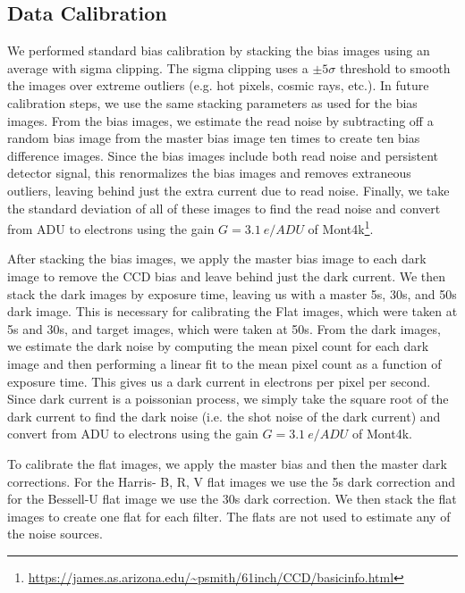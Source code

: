 \documentclass{aastex631}
\begin{document}
\subsection{Data Calibration}
We performed standard bias calibration by stacking the bias images using an average with sigma clipping. The sigma clipping uses a $\pm 5 \sigma$ threshold to smooth the images over extreme outliers (e.g. hot pixels, cosmic rays, etc.). In future calibration steps, we use the same stacking parameters as used for the bias images. From the bias images, we estimate the read noise by subtracting off a random bias image from the master bias image ten times to create ten bias difference images. Since the bias images include both read noise and persistent detector signal, this renormalizes the bias images and removes extraneous outliers, leaving behind just the extra current due to read noise. Finally, we take the standard deviation of all of these images to find the read noise and convert from ADU to electrons using the gain  $G=3.1~e/ADU$ of Mont4k\footnote{\url{https://james.as.arizona.edu/~psmith/61inch/CCD/basicinfo.html}}.

After stacking the bias images, we apply the master bias image to each dark image to remove the CCD bias and leave behind just the dark current. We then stack the dark images by exposure time, leaving us with a master 5s, 30s, and 50s dark image. This is necessary for calibrating the Flat images, which were taken at 5s and 30s, and target images, which were taken at 50s. From the dark images, we estimate the dark noise by computing the mean pixel count for each dark image and then performing a linear fit to the mean pixel count as a function of exposure time. This gives us a dark current in electrons per pixel per second. Since dark current is a poissonian process, we simply take the square root of the dark current to find the dark noise (i.e. the shot noise of the dark current) and convert from ADU to electrons using the gain $G=3.1~e/ADU$ of Mont4k. 

To calibrate the flat images, we apply the master bias and then the master dark corrections. For the Harris- B, R, V flat images we use the 5s dark correction and for the Bessell-U flat image we use the 30s dark correction. We then stack the flat images to create one flat for each filter. The flats are not used to estimate any of the noise sources.
\end{document}
